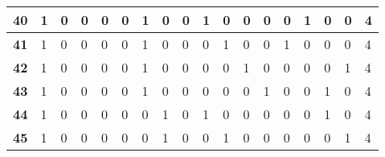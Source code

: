 \begin{table}[]
{\begin{tabular}{|P{0.6cm}|P{0.65cm}|P{0.65cm}|P{0.65cm}|P{0.65cm}|P{0.65cm}|P{0.65cm}|P{0.65cm}|P{0.65cm}|P{0.65cm}|P{0.65cm}|P{0.65cm}|P{0.65cm}|P{0.65cm}|P{0.65cm}|P{0.65cm}|P{0.65cm}|P{2.9cm}|}
\textbf{40}                        & 1                     & 0                     & 0                     & 0                     & 0                     & 1                     & 0                     & 0                     & 1                     & 0                     & 0                     & 0                     & 0                     & 1                     & 0                     & 0                     & 4                     \\ \hline
\textbf{41}                        & 1                     & 0                     & 0                     & 0                     & 0                     & 1                     & 0                     & 0                     & 0                     & 1                     & 0                     & 0                     & 1                     & 0                     & 0                     & 0                     & 4                     \\ \hline
\textbf{42}                        & 1                     & 0                     & 0                     & 0                     & 0                     & 1                     & 0                     & 0                     & 0                     & 0                     & 1                     & 0                     & 0                     & 0                     & 0                     & 1                     & 4                     \\ \hline
\textbf{43}                        & 1                     & 0                     & 0                     & 0                     & 0                     & 1                     & 0                     & 0                     & 0                     & 0                     & 0                     & 1                     & 0                     & 0                     & 1                     & 0                     & 4                     \\ \hline
\textbf{44}                        & 1                     & 0                     & 0                     & 0                     & 0                     & 0                     & 1                     & 0                     & 1                     & 0                     & 0                     & 0                     & 0                     & 0                     & 1                     & 0                     & 4                     \\ \hline
\textbf{45}                        & 1                     & 0                     & 0                     & 0                     & 0                     & 0                     & 1                     & 0                     & 0                     & 1                     & 0                     & 0                     & 0                     & 0                     & 0                     & 1                     & 4                     \\ \hline

\end{tabular}}
\end{table}
